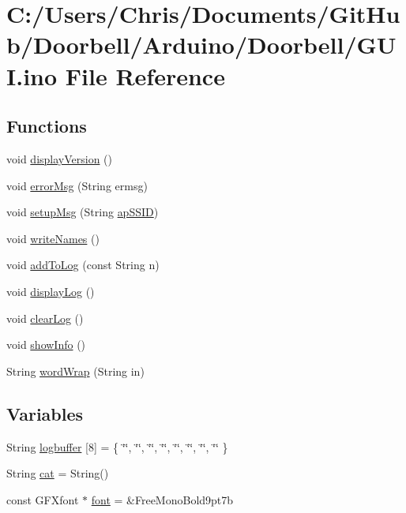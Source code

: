 \hypertarget{_g_u_i_8ino}{}\section{C\+:/\+Users/\+Chris/\+Documents/\+Git\+Hub/\+Doorbell/\+Arduino/\+Doorbell/\+G\+UI.ino File Reference}
\label{_g_u_i_8ino}
\subsection*{Functions}
\begin{DoxyCompactItemize}
\item 
void \mbox{\hyperlink{_g_u_i_8ino_a6d2ae46e53ca384472c7c54d3a75ef38}{display\+Version}} ()
\item 
void \mbox{\hyperlink{_g_u_i_8ino_a49c15add2b3fb1bab622467ffcf6584a}{error\+Msg}} (String ermsg)
\item 
void \mbox{\hyperlink{_g_u_i_8ino_ae2698a607f6e5be64f909e7ef2b9a579}{setup\+Msg}} (String \mbox{\hyperlink{_web_8ino_a4dc496fb2eea29ebc9e871cee941fa09}{ap\+S\+S\+ID}})
\item 
void \mbox{\hyperlink{_g_u_i_8ino_aa1bc5d27389d6a706f36fd90fb5e9fde}{write\+Names}} ()
\item 
void \mbox{\hyperlink{_g_u_i_8ino_a138c0032519f7273647d99d811789e9d}{add\+To\+Log}} (const String n)
\item 
void \mbox{\hyperlink{_g_u_i_8ino_a08da0e1bab37e09ab0e424b1693c2fe0}{display\+Log}} ()
\item 
void \mbox{\hyperlink{_g_u_i_8ino_ae2d5212eb62104cb3219318f03f23734}{clear\+Log}} ()
\item 
void \mbox{\hyperlink{_g_u_i_8ino_a6da7bf7685a4f65561ec15045a11b993}{show\+Info}} ()
\item 
String \mbox{\hyperlink{_g_u_i_8ino_ab945e0c8dbab7335f8dab9a01363277e}{word\+Wrap}} (String in)
\end{DoxyCompactItemize}
\subsection*{Variables}
\begin{DoxyCompactItemize}
\item 
String \mbox{\hyperlink{_g_u_i_8ino_a5ec41fe3f7e063b47e8647028289549f}{logbuffer}} \mbox{[}8\mbox{]} = \{ \char`\"{}\char`\"{}, \char`\"{}\char`\"{}, \char`\"{}\char`\"{}, \char`\"{}\char`\"{}, \char`\"{}\char`\"{}, \char`\"{}\char`\"{}, \char`\"{}\char`\"{}, \char`\"{}\char`\"{} \}
\item 
String \mbox{\hyperlink{_g_u_i_8ino_aa06b06b459c7abb28f43da864fd7d6d2}{cat}} = String()
\item 
const G\+F\+Xfont $\ast$ \mbox{\hyperlink{_g_u_i_8ino_aef0f17f605f3193c781b789597ead6de}{font}} = \&Free\+Mono\+Bold9pt7b
\end{DoxyCompactItemize}


